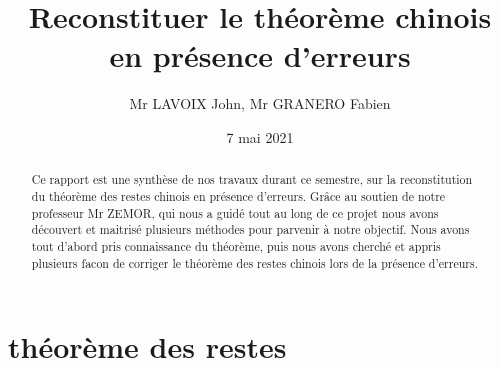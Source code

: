 \documentclass[a4paper, 11pt]{report}
\title{Reconstituer le théorème chinois en présence d’erreurs}
\author{Mr LAVOIX John, Mr GRANERO Fabien }
\date{7 mai 2021}
\begin{document}
\maketitle

\begin{abstract}

Ce rapport est  une synthèse de nos travaux durant ce semestre, sur la reconstitution du théorème des restes chinois en présence d'erreurs.
Grâce au soutien de notre professeur Mr ZEMOR, qui nous a guidé tout au long de ce projet nous avons découvert et maitrisé plusieurs méthodes pour parvenir à notre objectif.
Nous avons tout d'abord pris connaissance du théorème, puis nous avons cherché et appris plusieurs facon de corriger le théorème des restes chinois lors de la présence d'erreurs.

\end{abstract}


\tableofcontents

\newpage

\chapter{théorème des restes}
\end{document}
